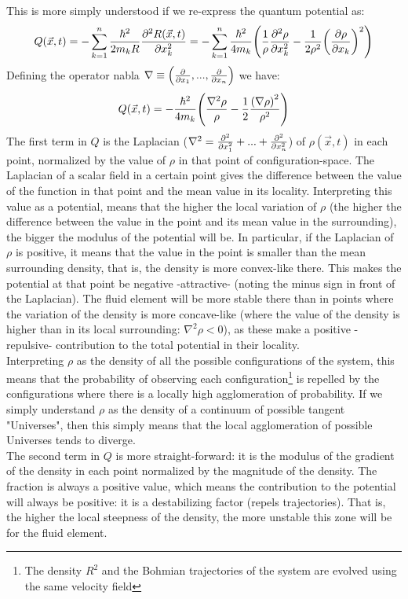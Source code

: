 \documentclass[11pt, a4paper]{article} %
\DeclareRobustCommand{\mybox}[2][gray!20]{%
\begin{tcolorbox}[   %
        left=1cm,
        right=1cm,
        top=0.5cm,
        bottom=0.5cm,
        colback=#1,
        colframe=#1,
        width=\dimexpr\textwidth\relax, 
        enlarge left by=0mm,
        boxsep=5pt,
        arc=0pt,outer arc=0pt,
        ]
        #2
\end{tcolorbox}
}
\begin{document}
\mybox{
This is more simply understood if we re-express the quantum potential as:
$$
Q(\vec{x},t) = -\sum_{k=1}^n \frac{\hbar^2}{2m_k R}\pdv[2]{R(\vec{x}, t)}{x_k} =  -\sum_{k=1}^n \frac{\hbar^2}{4m_k} \qty(\frac{1}{\rho}\pdv[2]{\rho}{x_k} -\frac{1}{2\rho^2}\qty(\pdv{\rho}{x_k})^2)
$$
Defining the operator nabla $\nabla \equiv \qty(\pdv{}{x_1}, ... , \pdv{}{x_n})$ we have:
\begin{equation}\label{Q2}
Q(\vec{x},t) = -\frac{\hbar^2}{4m_k }\qty(\frac{\nabla^2\rho}{\rho} -\frac{1}{2}\frac{\qty(\nabla \rho)^2}{\rho^2})\vspace{-0.2cm}
\end{equation}
The first term in $Q$ is the Laplacian ($\nabla^2 = \pdv[2]{}{x_1}+...+\pdv[2]{}{x_n}$) of $\rho(\vec{x},t)$ in each point, normalized by the value of $\rho$ in that point of configuration-space. The Laplacian of a scalar field in a certain point gives the difference between the value of the function in that point and the mean value in its locality. Interpreting this value as a potential, means that the higher the local variation of $\rho$ (the higher the difference between the value in the point and its mean value in the surrounding), the bigger the modulus of the potential will be. In particular, if the Laplacian of $\rho$ is positive, it means that the value in the point is smaller than the mean surrounding density, that is, the density is more convex-like there. This makes the potential at that point be negative -attractive- (noting the minus sign in front of the Laplacian). The fluid element will be more stable there than in points where the variation of the density is more concave-like (where the value of the density is higher than in its local surrounding: $\nabla^2 \rho<0$), as these make a positive -repulsive- contribution to the total potential in their locality.\\

Interpreting $\rho$ as the density of all the possible configurations of the system, this means that the probability of observing each configuration\footnote{ The density $R^2$ and the Bohmian trajectories of the system are evolved using the same velocity field} is repelled by the configurations where there is a locally high agglomeration of probability. If we simply understand $\rho$ as the density of a continuum of possible tangent "Universes", then this simply means that the local agglomeration of possible Universes tends to diverge.\\

The second term in $Q$ is more straight-forward: it is the modulus of the gradient of the density in each point normalized by the magnitude of the density. The fraction is always a positive value, which means the contribution to the potential will always be positive: it is a destabilizing factor (repels trajectories). That is, the higher the local steepness of the density, the more unstable this zone will be for the fluid element.
}
\end{document}
